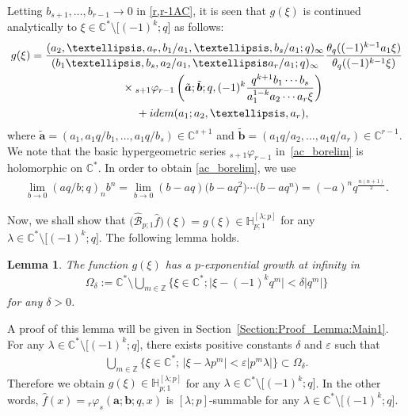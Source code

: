 \documentclass[11pt]{article}
\numberwithin{equation}{section}
\newtheorem{Lemma}[Theorem]{Lemma}
\newcommand{\idem}{{\rm idem}}
\begin{document}
Letting $b_{s+1},\ldots,b_{r-1}\to 0$ in \eqref{r,r-1AC}, it is seen that $g(\xi)$ is continued analytically to $\xi\in\mathbb{C}^*\setminus\big[(-1)^{k};q\big]$ as follows:
\begin{gather}
g(\xi)=\frac{(a_2,\ldots,a_r,b_1/a_1,\ldots,b_{s}/a_1;q)_\infty}{(b_1\ldots,b_s,a_2/a_1,\ldots a_r/a_1;q)_\infty}\frac{\theta_q((-1)^{k-1}a_1\xi)}{\theta_q((-1)^{k-1}\xi)}\nonumber\\
\hphantom{g(\xi)=}{} \times{}_{s+1}\varphi_{r-1}\left(\tilde{\bm{a}};\tilde{\bm{b}};q,(-1)^k\frac{q^{k+1}b_1\cdots b_s}{a_1^{1-k}a_2\cdots a_r\xi}\right)\nonumber\\
\hphantom{g(\xi)=}{} +\idem(a_1;a_2,\ldots,a_r),\label{ac_borelim}
\end{gather}
where $\tilde{\bm{a}}=(a_1,a_1q/b_1,\ldots,a_1q/b_s)\in\mathbb{C}^{s+1}$ and $\tilde{\bm{b}}=(a_1q/a_2,\ldots,a_1q/a_r)\in\mathbb{C}^{r-1}$. We note that the basic hypergeometric series ${}_{s+1}\varphi_{r-1}$ in~\eqref{ac_borelim} is holomorphic on $\mathbb{C}^*$. In order to obtain \eqref{ac_borelim}, we use
\begin{gather*}
\lim_{b\to0}(aq/b;q)_nb^n=\lim_{b\to0}(b-aq)\big(b-aq^2\big)\cdots\big(b-aq^n\big)=(-a)^nq^{\frac{n(n+1)}{2}}.
\end{gather*}

Now, we shall show that $\big(\hat{\mathcal{B}}_{p;1}\hat{f}\big)(\xi)=g(\xi)\in\mathbb{H}_{p;1}^{[\lambda;p]}$ for any $\lambda\in\mathbb{C}^*\setminus\big[(-1)^k;q\big]$. The following lemma holds.
\begin{Lemma}\label{Lemma:Main1}
The function $g(\xi)$ has a $p$-exponential growth at infinity in
\begin{gather*}
\Omega_\delta:=\mathbb{C}^*\setminus\bigcup_{m\in\mathbb{Z}}\big\{\xi\in\mathbb{C}^* ;\big\vert\xi-(-1)^{k}q^m\vert<\delta\big\vert q^m\vert\big\}
\end{gather*}
for any $\delta>0$.
\end{Lemma}
A proof of this lemma will be given in Section~\ref{Section:Proof_Lemma:Main1}. For any $\lambda\in\mathbb{C}^*\setminus\big[(-1)^k;q\big]$, there exists positive constants $\delta$ and $\varepsilon$ such that
\begin{gather*}
\bigcup_{m\in\mathbb{Z}}\big\{\xi\in\mathbb{C}^* ;\,\vert\xi-\lambda p^m\vert<\varepsilon\vert p^m\lambda\vert\big\}\subset\Omega_\delta.
\end{gather*}
Therefore we obtain $g(\xi)\in\mathbb{H}_{p;1}^{[\lambda;p]}$ for any $\lambda\in\mathbb{C}^*\setminus\big[(-1)^k;q\big]$. In the other words, $\hat{f}(x)={}_r\varphi_s(\bm{a};\bm{b};q,x)$ is $[\lambda;p]$-summable for any $\lambda\in\mathbb{C}^*\setminus\big[(-1)^k;q\big]$.
\end{document}
